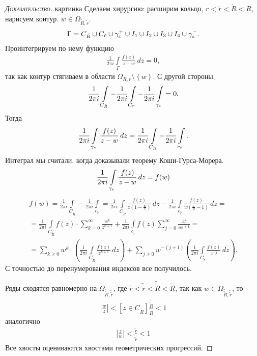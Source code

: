 \documentclass[../../main.tex]{subfiles}
\begin{document}
\begin{proof}[\normalfont\textsc{Доказательство}]
 {\color{red} картинка} Сделаем хирургию: расширим кольцо, $ r < \tilde r < \tilde R < R $, нарисуем контур. $ w \in \Omega_{\tilde R, \tilde r} $.
 \begin{align*}
  \Gamma = C_{\tilde R} \cup C_{\tilde r} \cup \gamma_\varepsilon^{+} \cup I_1 \cup I_2 \cup I_3 \cup I_4 \cup \gamma_\varepsilon^{-}.
 \end{align*} Проинтегрируем по нему функцию
 \begin{align*}
  \frac{1}{2\pi i} \int\limits_{\Gamma} \frac{f(z)}{z - w}  \, dz = 0,
 \end{align*} так как контур стягиваем в области $ \Omega_{R,r} \setminus \left\{ w \right\} $. С другой стороны,
 \begin{align*}
  \frac{1}{2\pi i} \int\limits_{C_{\tilde R}}   - \frac{1}{2\pi i} \int\limits_{C_{\tilde r}}  - \frac{1}{2\pi i} \int\limits_{\gamma_\varepsilon}   = 0.
 \end{align*} Тогда
 \begin{align*}
  \frac{1}{2\pi i} \int\limits_{\gamma_\varepsilon} \frac{f(z)}{z-w}\,dz = \frac{1}{2\pi i} \int\limits_{C_{\tilde R}}   - \frac{1}{2\pi i}\int\limits_{c_{\tilde r}}.
 \end{align*} Интеграл мы считали, когда доказывали теорему Коши-Гурса-Морера.
 \begin{align*}
  \frac{1}{2\pi i} \int\limits_{\gamma_\varepsilon}   \frac{f(z)}{z-w}\,dz = f(w)
 \end{align*}
 \begin{align*}
  f(w) = \frac{1}{2\pi i} \int\limits_{C_{\tilde R}}   - \frac{1}{2\pi i} \int\limits_{c_{\tilde r}}  = \frac{1}{2\pi i} \int\limits_{C_{\tilde R}}   \frac{f(z)}{z(1 - \frac{w}{z})}\,dz - \frac{1}{2\pi i} \int\limits_{c_{\tilde r}}   \frac{f(z)}{w(\frac{z}{w}-1)}\,dz = \\
  = \frac{1}{2\pi i}  \int\limits_{C_{\tilde R}} f(z) \cdot \sum_{k=0}^{\infty} \frac{w^{k}}{z^{k+1}}   + \frac{1}{2\pi i} \int\limits_{c_{\tilde r}}  f(z) \sum_{j=0}^{\infty}\frac{z^{j}}{w^{j+1}} = \\
  = \sum_{k \geqslant 0} w^{k} \cdot \left(\frac{1}{2\pi i} \int\limits_{C_{\tilde R}}   \frac{f(z)}{z^{k+1}}\,dz \right) + \sum_{j \geqslant 0} w^{-(j+1)} \left( \frac{1}{2\pi i} \int\limits_{C_{\tilde r}} \frac{f(z)}{z^{-j}}\,dz   \right).
 \end{align*} С точностью до перенумерования индексов все получилось. 

 Ряды сходятся равномерно на $ \Omega_{\tilde\tilde R, \tilde\tilde r} $, где $ \tilde r < \tilde\tilde r < \tilde \tilde R < \tilde R $, так как $ w \in \Omega_{\tilde\tilde R, \tilde\tilde r} $, то
 \begin{align*}
  \left| \frac{w}{z} \right| < [z \in C_{\tilde R}] \frac{\tilde{\tilde R}}{\tilde R} < 1
 \end{align*} аналогично
 \begin{align*}
  \left| \frac{z}{w} \right| < \frac{\tilde r}{\tilde{\tilde r}} < 1
 \end{align*} Все хвосты оцениваются хвостами геометрических прогрессий.
\end{proof}
\end{document}
